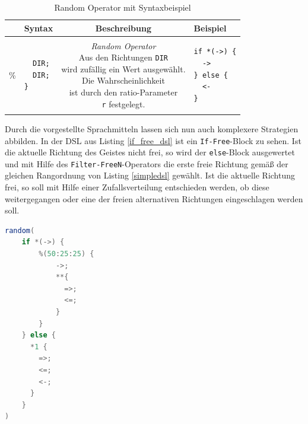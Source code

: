 \documentclass[conference]{IEEEtran}
\begin{document}
\begin{table}[!htb]
\caption{Random Operator mit Syntaxbeispiel}
\label{random_op}
\centering
\setlength\tabcolsep{1.5pt}
\begin{tabular}{|c||l|c|l|}
\hline
& \textbf{Syntax} & \textbf{Beschreibung} & \textbf{Beispiel}\\

\hline
\% &

\begin{lstlisting}[basicstyle=\scriptsize\ttfamily]
%(r:r) {
  DIR;
  DIR;
}
\end{lstlisting} &

\makecell{\textit{Random Operator}\\
Aus den Richtungen \texttt{DIR}\\ wird zufällig
ein Wert ausgewählt.\\ Die Wahrscheinlichkeit\\
ist durch den ratio-Parameter \\
\texttt{r} festgelegt.} &

\begin{lstlisting}[basicstyle=\scriptsize\ttfamily]
if *(->) {
  ->
} else {
  <-
}
\end{lstlisting} \\
\hline

\end{tabular}
\end{table}

Durch die vorgestellte Sprachmitteln lassen sich nun auch komplexere Strategien abbilden. In der DSL aus Listing \ref{if_free_dsl} ist ein \texttt{If-Free}-Block zu sehen. Ist die aktuelle Richtung des Geistes nicht frei, so wird der \texttt{else}-Block ausgewertet und mit Hilfe des \texttt{Filter-FreeN}-Operators die erste freie Richtung gemäß der gleichen Rangordnung von Listing \ref{simpledsl} gewählt. Ist die aktuelle Richtung frei, so soll mit Hilfe einer Zufallsverteilung entschieden werden, ob diese weitergegangen oder eine der freien alternativen Richtungen eingeschlagen werden soll.

\begin{lstlisting}[language=Java, captionpos=b, caption=AI DSL mit \texttt{If-Free}-Block und Zufallsverteilung, label=if_free_dsl]
random(
    if *(->) {
        %(50:25:25) {
            ->;
            **{
              =>;
              <=;
            }
        }
    } else {
      *1 {
        =>;
        <=;
        <-;
      }
    }
)
\end{lstlisting}
\end{document}
